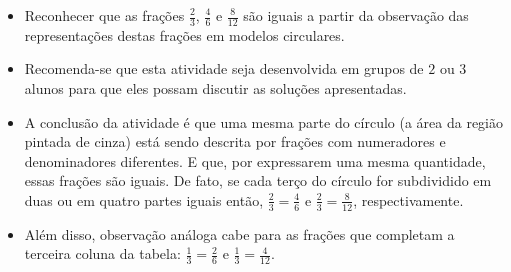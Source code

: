 \newpage

\begin{objetivos}[label=chap4-ativ5]{}{}
\begin{itemize} %
    \item       Reconhecer que as frações $\frac{2}{3}$, $\frac{4}{6}$ e $\frac{8}{12}$ são iguais a partir da observação das representações destas frações em modelos circulares.
\end{itemize} %
\end{objetivos}

\begin{orientacoes}{}{}

\begin{itemize} %
    \item       Recomenda-se que esta atividade seja desenvolvida em grupos de
    $2$       ou       $3$       alunos para que eles possam discutir as
soluções apresentadas.
    \item   A conclusão da atividade é que uma mesma parte do círculo (a área da região pintada de cinza) está sendo descrita por frações com numeradores e denominadores diferentes. E que, por expressarem uma mesma quantidade, essas frações são iguais. De fato, se cada terço do círculo for subdividido em duas ou em quatro partes iguais então, $\frac{2}{3} = \frac{4}{6}$ e $\frac{2}{3} = \frac{8}{12}$, respectivamente.
    \item       Além disso, observação análoga cabe para as frações que
completam a terceira coluna da tabela:       $\frac{1}{3}=\frac{2}{6}$       e       $\frac{1}{3}=\frac{4}{12}$.
\end{itemize} %

   \vspace{.1cm}


\end{orientacoes}

